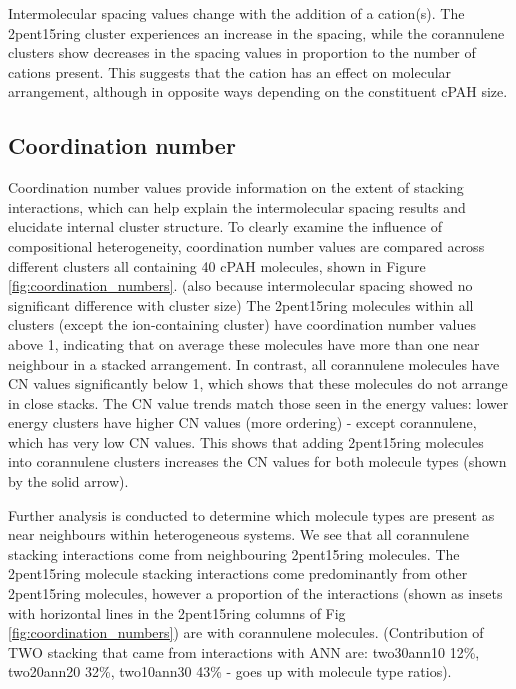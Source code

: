 Intermolecular spacing values change with the addition of a cation(s). The 2pent15ring cluster experiences an increase in the spacing, while the corannulene clusters show decreases in the spacing values in proportion to the number of cations present. This suggests that the cation has an effect on molecular arrangement, although in opposite ways depending on the constituent cPAH size.

\subsection{Coordination number}

Coordination number values provide information on the extent of stacking interactions, which can help explain the intermolecular spacing results and elucidate internal cluster structure. To clearly examine the influence of compositional heterogeneity, coordination number values are compared across different clusters all containing 40 cPAH molecules, shown in Figure \ref{fig:coordination_numbers}. (also because intermolecular spacing showed no significant difference with cluster size) %
The 2pent15ring molecules within all clusters (except the ion-containing cluster) have coordination number values above 1, indicating that on average these molecules have more than one near neighbour in a stacked arrangement. In contrast, all corannulene molecules have CN values significantly below 1, which shows that these molecules do not arrange in close stacks.  The CN value trends match those seen in the energy values: lower energy clusters have higher CN values (more ordering) - except corannulene, which has very low CN values. %
This shows that adding 2pent15ring molecules into corannulene clusters increases the CN values for both molecule types (shown by the solid arrow).

Further analysis is conducted to determine which molecule types are present as near neighbours within heterogeneous systems.  We see that all corannulene stacking interactions come from neighbouring 2pent15ring molecules.  The 2pent15ring molecule stacking interactions come predominantly from other 2pent15ring molecules, however a proportion of the interactions (shown as insets with horizontal lines in the 2pent15ring columns of Fig \ref{fig:coordination_numbers}) are with corannulene molecules.  (Contribution of TWO stacking that came from interactions with ANN are: two30ann10 12\%, two20ann20 32\%, two10ann30 43\% - goes up with molecule type ratios).

